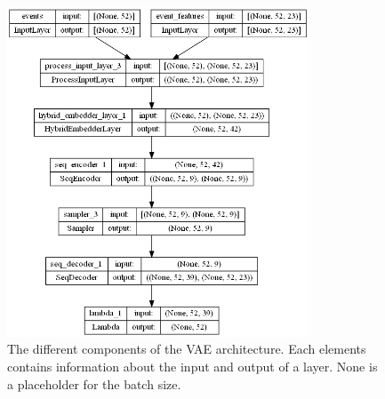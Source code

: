 \documentclass[./../../paper.tex]{subfiles}
\begin{document}
\begin{figure}[htbp]
    \centering
    \includegraphics[width=0.8\textwidth]{figures/generator50lstm.png}
    \caption{The different components of the VAE architecture. Each elements contains information about the input and output of a layer. None is a placeholder for the batch size.}
    \label{fig:vae_architecture}
\end{figure}
\end{document}
